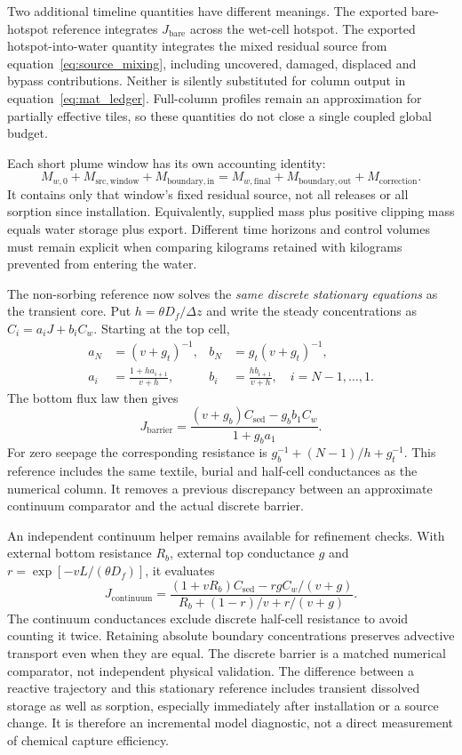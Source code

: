 Two additional timeline quantities have different meanings. The exported bare-hotspot reference integrates $J_{\mathrm{bare}}$ across the wet-cell hotspot. The exported hotspot-into-water quantity integrates the mixed residual source from equation~\eqref{eq:source_mixing}, including uncovered, damaged, displaced and bypass contributions. Neither is silently substituted for column output in equation~\eqref{eq:mat_ledger}. Full-column profiles remain an approximation for partially effective tiles, so these quantities do not close a single coupled global budget.

Each short plume window has its own accounting identity:
\begin{equation}
 M_{w,0}+M_{\mathrm{src,window}}+M_{\mathrm{boundary,in}}
 =M_{w,\mathrm{final}}+M_{\mathrm{boundary,out}}+M_{\mathrm{correction}}.
 \label{eq:water_ledger}
\end{equation}
It contains only that window's fixed residual source, not all releases or all sorption since installation. Equivalently, supplied mass plus positive clipping mass equals water storage plus export. Different time horizons and control volumes must remain explicit when comparing kilograms retained with kilograms prevented from entering the water.

The non-sorbing reference now solves the \emph{same discrete stationary equations} as the transient core. Put $h=\theta D_f/\Delta z$ and write the steady concentrations as $C_i=a_iJ+b_iC_w$. Starting at the top cell,
\begin{align}
 a_N&=(v+g_t)^{-1}, &b_N&=g_t(v+g_t)^{-1},\\
 a_i&=\frac{1+h a_{i+1}}{v+h}, &b_i&=\frac{h b_{i+1}}{v+h},\quad i=N-1,\ldots,1.
\end{align}
The bottom flux law then gives
\begin{equation}
 J_{\mathrm{barrier}}=
 \frac{(v+g_b)C_{\mathrm{sed}}-g_bb_1C_w}{1+g_ba_1}.
 \label{eq:barrier_limit}
\end{equation}
For zero seepage the corresponding resistance is
$g_b^{-1}+(N-1)/h+g_t^{-1}$. This reference includes the same textile, burial and half-cell conductances as the numerical column. It removes a previous discrepancy between an approximate continuum comparator and the actual discrete barrier.

An independent continuum helper remains available for refinement checks. With external bottom resistance $R_b$, external top conductance $g$ and $r=\exp[-vL/(\theta D_f)]$, it evaluates
\begin{equation}
 J_{\mathrm{continuum}}=
 \frac{(1+vR_b)C_{\mathrm{sed}}-rgC_w/(v+g)}
 {R_b+(1-r)/v+r/(v+g)}.
\end{equation}
The continuum conductances exclude discrete half-cell resistance to avoid counting it twice. Retaining absolute boundary concentrations preserves advective transport even when they are equal. The discrete barrier is a matched numerical comparator, not independent physical validation. The difference between a reactive trajectory and this stationary reference includes transient dissolved storage as well as sorption, especially immediately after installation or a source change. It is therefore an incremental model diagnostic, not a direct measurement of chemical capture efficiency.
